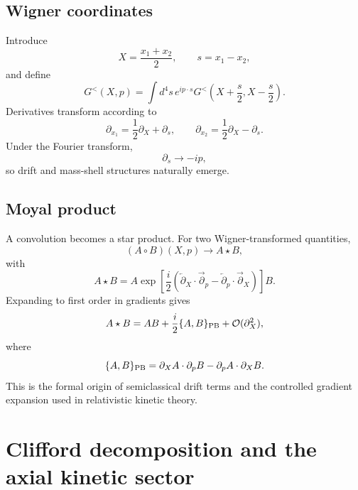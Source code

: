 \documentclass[11pt]{article}
\begin{document}
\subsection{Wigner coordinates}

Introduce
\begin{equation}
X=\frac{x_1+x_2}{2},
\qquad
s=x_1-x_2,
\end{equation}
and define
\begin{equation}
G^<(X,p)
=\int d^4s\,e^{ip\cdot s}
G^<\left(X+\frac{s}{2},X-\frac{s}{2}\right).
\label{eq:wigner}
\end{equation}
Derivatives transform according to
\begin{equation}
\partial_{x_1}
=\frac12\partial_X+\partial_s,
\qquad
\partial_{x_2}
=\frac12\partial_X-\partial_s.
\end{equation}
Under the Fourier transform,
\begin{equation}
\partial_s\to -ip,
\end{equation}
so drift and mass-shell structures naturally emerge.

\subsection{Moyal product}

A convolution becomes a star product. For two Wigner-transformed quantities,
\begin{equation}
(A\circ B)(X,p)\to A\star B,
\end{equation}
with
\begin{equation}
\boxed{
A\star B
=A\exp\left[
\frac{i}{2}
\left(
\overleftarrow\partial_X\cdot\overrightarrow\partial_p
-
\overleftarrow\partial_p\cdot\overrightarrow\partial_X
\right)
\right]B.
}
\label{eq:moyal}
\end{equation}
Expanding to first order in gradients gives
\begin{equation}
A\star B
=AB+\frac{i}{2}\{A,B\}_{\rm PB}+\mathcal O(\partial_X^2),
\end{equation}
where
\begin{equation}
\{A,B\}_{\rm PB}
=\partial_XA\cdot\partial_pB
-\partial_pA\cdot\partial_XB.
\end{equation}
This is the formal origin of semiclassical drift terms and the controlled gradient expansion used in relativistic kinetic theory.

\section{Clifford decomposition and the axial kinetic sector}
\end{document}
